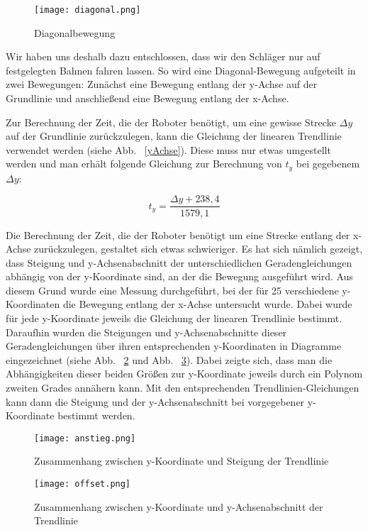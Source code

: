 \begin{figure}[htbp]
\centering
\texttt{[image: diagonal.png]}
\caption{Diagonalbewegung} 
\label{diagonal}
\end{figure} 

\pagebreak
Wir haben uns deshalb dazu entschlossen, dass wir den Schläger nur auf festgelegten Bahnen fahren lassen. So wird eine Diagonal-Bewegung aufgeteilt in zwei Bewegungen: Zunächst eine Bewegung entlang der y-Achse auf der Grundlinie und anschließend eine Bewegung entlang der x-Achse. 

Zur Berechnung der Zeit, die der Roboter benötigt, um eine gewisse Strecke $ \Delta y $ auf der Grundlinie zurückzulegen, kann die Gleichung der linearen Trendlinie verwendet werden (siehe Abb. ~\ref{yAchse}). Diese muss nur etwas umgestellt werden und man erhält folgende Gleichung zur Berechnung von $ t_y $ bei gegebenem $ \Delta y $:

\begin{equation}
t_y =\frac{\Delta y + 238,4}{1579,1}
\end{equation} 

Die Berechnung der Zeit, die der Roboter benötigt um eine Strecke entlang der x-Achse zurückzulegen, gestaltet sich etwas schwieriger. Es hat sich nämlich gezeigt, dass Steigung und y-Achsenabschnitt der unterschiedlichen Geradengleichungen abhängig von der y-Koordinate sind, an der die Bewegung ausgeführt wird. Aus diesem Grund wurde eine Messung durchgeführt, bei der für 25 verschiedene y-Koordinaten die Bewegung entlang der x-Achse untersucht wurde. Dabei wurde für jede y-Koordinate jeweils die Gleichung der linearen Trendlinie bestimmt. Daraufhin wurden die Steigungen und y-Achsenabschnitte dieser Geradengleichungen über ihren entsprechenden y-Koordinaten in Diagramme eingezeichnet (siehe Abb. ~\ref{anstieg} und Abb. ~\ref{offset}). Dabei zeigte sich, dass man die Abhängigkeiten dieser beiden Größen zur y-Koordinate jeweils durch ein Polynom zweiten Grades annähern kann. Mit den entsprechenden Trendlinien-Gleichungen kann dann die Steigung und der y-Achsenabschnitt bei vorgegebener y-Koordinate bestimmt werden. 

\begin{figure}[htbp]
\centering
\texttt{[image: anstieg.png]}
\caption{Zusammenhang zwischen y-Koordinate und Steigung der Trendlinie} 
\label{anstieg}
\end{figure}

\begin{figure}[htbp]
\centering
\texttt{[image: offset.png]}
\caption{Zusammenhang zwischen y-Koordinate und y-Achsenabschnitt der Trendlinie} 
\label{offset}
\end{figure}

